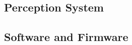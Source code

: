 

\subsection{Perception System}\label{subsec:perception-system}


\subsection{Software and Firmware}\label{subsec:software-and-firmware}
